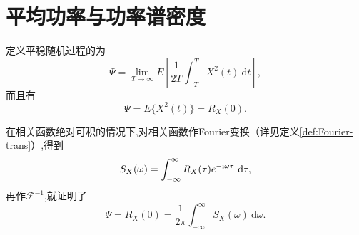 \documentclass[cn,10pt,citestyle=gb7714-2015,bibstyle=gb7714-2015]{elegantbook}
\newcommand{\md}{\ \mathrm{d}}
\newcommand{\image}{\textup{i}}
\begin{document}
\section{平均功率与功率谱密度}
\begin{definition}[平均功率]\label{def:avg-power}
  定义平稳随机过程的为
  \begin{equation}
    \varPsi=\lim_{T\to\infty}E\left[\frac{1}{2T}\int_{-T}^TX^2(t)\md t\right],
  \end{equation}
  而且有
  \begin{equation}
    \varPsi=E\{X^2(t)\}=R_X(0).
  \end{equation}
\end{definition}
\begin{definition}[功率谱密度]\label{def:Power-Spectral-Density}
  在相关函数绝对可积的情况下,对相关函数作\textup{Fourier}变换（详见定义\ref{def:Fourier-trans}）,得到
  \begin{equation}
    S_X(\omega)=\int_{-\infty}^\infty R_X(\tau)e^{-\image\omega\tau}\md\tau,
  \end{equation}
  再作$\mathscr{F}^{-1}$,就证明了
  \begin{equation}
    \varPsi=R_X(0)=\frac{1}{2\pi}\int_{-\infty}^\infty S_X(\omega)\md\omega.
  \end{equation}
\end{definition}
\end{document}
